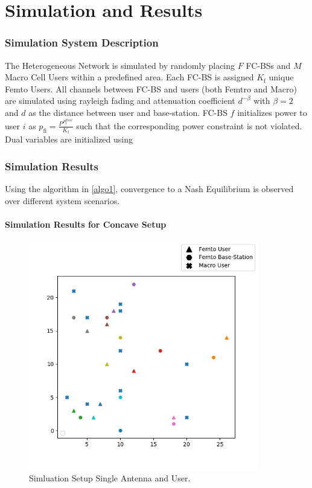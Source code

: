 \documentclass[12pt,a4paper]{report}
\begin{document}
\chapter{Simulation and Results}\label{numerical}
\subsection{Simulation System Description}
The Heterogeneous Network is simulated by randomly placing $F $ FC-BSs and $M$ Macro Cell Users within a predefined area. Each FC-BS is assigned $K_{\mathrm{f}}$ unique Femto Users. All channels between FC-BS and users (both Femtro and Macro) are simulated using rayleigh fading and attenuation coefficient $d^{- \beta}$ with $\beta =2$ and $d$ as the distance between user and base-station.
FC-BS $f$ initializes power to user $i$ as $p_{\mathrm{fi}} = \frac{P^{P_{\mathrm{f}}^{Total}}}{K_{\mathrm{f}}} $ such that the corresponding power constraint is not violated. 
Dual variables are initialized using  



\subsection{Simulation Results}
Using the algorithm in \ref{algo1}, convergence to a Nash Equilibrium is observed over different system scenarios. 
\subsubsection{Simulation Results for Concave Setup}

\begin{figure}[H]
	\includegraphics[width=\textwidth,height = 10cm]{figures/system_figure_single}
	  \caption{Simluation Setup Single Antenna and User.  }
\end{figure}
\end{document}
